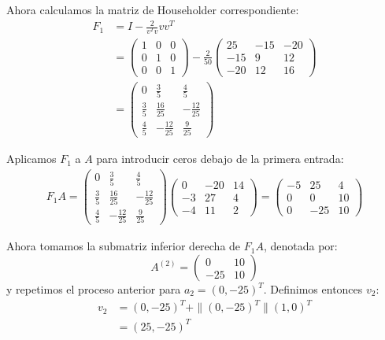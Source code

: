 \begin{homeworkProblem}
\begin{itemize}
\begin{solucion}
    Ahora calculamos la matriz de Householder correspondiente:
    \begin{align*}
        F_1 &= I - \frac{2}{v^T v} v v^{T}\\
        &= \begin{pmatrix} 1&0&0\\ 0&1&0\\ 0&0&1 \end{pmatrix} 
        - \frac{2}{50} 
        \begin{pmatrix}
            25 & -15 & -20\\
            -15 & 9 & 12\\
            -20 & 12 & 16
        \end{pmatrix}\\
        &= \begin{pmatrix}
            0 & \frac{3}{5} & \frac{4}{5}\\
            \frac{3}{5} & \frac{16}{25} & -\frac{12}{25}\\
            \frac{4}{5} & -\frac{12}{25} & \frac{9}{25}
        \end{pmatrix}
    \end{align*}

    Aplicamos $F_1$ a $A$ para introducir ceros debajo de la primera entrada:
    \begin{align*}
        F_1 A = 
        \begin{pmatrix}
            0 & \frac{3}{5} & \frac{4}{5}\\
            \frac{3}{5} & \frac{16}{25} & -\frac{12}{25}\\
            \frac{4}{5} & -\frac{12}{25} & \frac{9}{25}
        \end{pmatrix}
        \begin{pmatrix}
            0 & -20 & 14\\
            -3 & 27 & 4\\
            -4 & 11 & 2
        \end{pmatrix}
        =
        \begin{pmatrix}
            -5 & 25 & 4\\
            0 & 0 & 10\\
            0 & -25 & 10
        \end{pmatrix}
    \end{align*}

    Ahora tomamos la submatriz inferior derecha de $F_1 A$, denotada por:
    \[
    A^{(2)} =
    \begin{pmatrix}
        0 & 10\\
        -25 & 10
    \end{pmatrix}
    \]
    y repetimos el proceso anterior para $a_2=(0, -25)^{T}$. Definimos entonces $v_2$:
    \begin{align*}
        v_2 &= (0, -25)^{T} + \|(0, -25)^{T}\|(1, 0)^{T} \\
        &= (25, -25)^{T}
    \end{align*}


\end{solucion}
\end{itemize}
\end{homeworkProblem}
